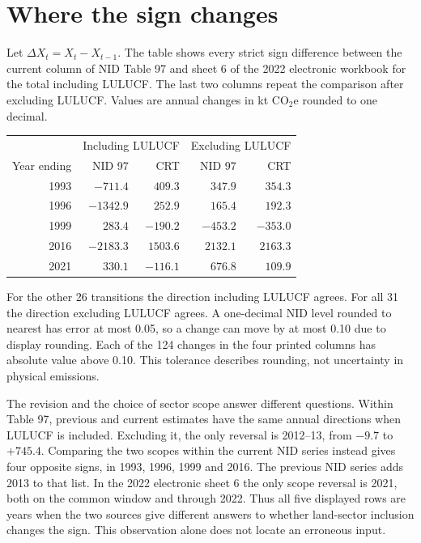 \documentclass[11pt]{article}
\begin{document}
\newpage
\section{Where the sign changes}
Let $\Delta X_t=X_t-X_{t-1}$. The table shows every strict sign difference between the current column of NID Table 97 and sheet 6 of the 2022 electronic workbook for the total including LULUCF. The last two columns repeat the comparison after excluding LULUCF. Values are annual changes in kt CO$_2$e rounded to one decimal.
\begin{center}
\begin{tabular}{rrrrr}\toprule
&\multicolumn{2}{c}{Including LULUCF}&\multicolumn{2}{c}{Excluding LULUCF}\\
Year ending & NID 97 & CRT & NID 97 & CRT\\\midrule
1993 & $-711.4$ & $409.3$ & $347.9$ & $354.3$\\
1996 & $-1342.9$ & $252.9$ & $165.4$ & $192.3$\\
1999 & $283.4$ & $-190.2$ & $-453.2$ & $-353.0$\\
2016 & $-2183.3$ & $1503.6$ & $2132.1$ & $2163.3$\\
2021 & $330.1$ & $-116.1$ & $676.8$ & $109.9$\\\bottomrule
\end{tabular}
\end{center}
For the other 26 transitions the direction including LULUCF agrees. For all 31 the direction excluding LULUCF agrees. A one-decimal NID level rounded to nearest has error at most 0.05, so a change can move by at most 0.10 due to display rounding. Each of the 124 changes in the four printed columns has absolute value above 0.10. This tolerance describes rounding, not uncertainty in physical emissions.

The revision and the choice of sector scope answer different questions. Within Table 97, previous and current estimates have the same annual directions when LULUCF is included. Excluding it, the only reversal is 2012--13, from $-9.7$ to $+745.4$. Comparing the two scopes within the current NID series instead gives four opposite signs, in 1993, 1996, 1999 and 2016. The previous NID series adds 2013 to that list. In the 2022 electronic sheet 6 the only scope reversal is 2021, both on the common window and through 2022. Thus all five displayed rows are years when the two sources give different answers to whether land-sector inclusion changes the sign. This observation alone does not locate an erroneous input.
\end{document}

